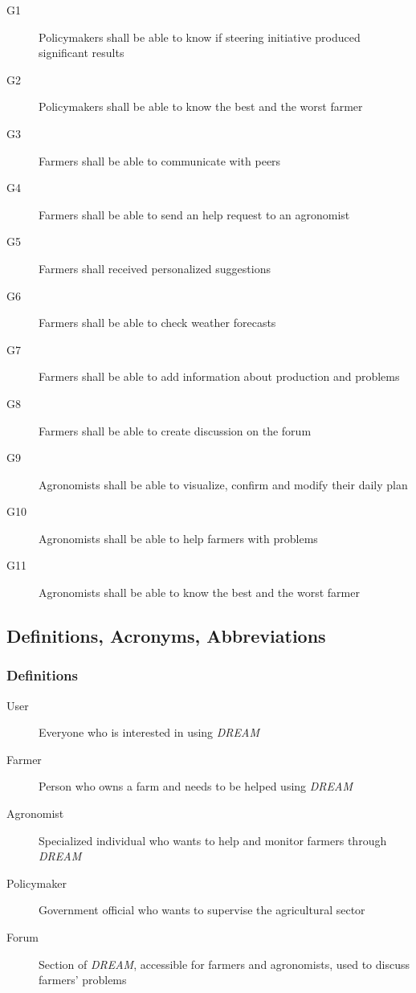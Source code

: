\begin{description}
    \item [G1] Policymakers shall be able to know if steering initiative produced significant results
    \item [G2] Policymakers shall be able to know the best and the worst farmer
    \item [G3] Farmers shall be able to communicate with peers
    \item [G4] Farmers shall be able to send an help request to an agronomist
    \item [G5] Farmers shall received personalized suggestions
    \item [G6] Farmers shall be able to check weather forecasts
    \item [G7] Farmers shall be able to add information about production and problems
    \item [G8] Farmers shall be able to create discussion on the forum
    \item [G9] Agronomists shall be able to visualize, confirm and modify their daily plan
    \item [G10] Agronomists shall be able to help farmers with problems
    \item [G11] Agronomists shall be able to know the best and the worst farmer
\end{description}

\subsection{Definitions, Acronyms, Abbreviations}

\subsubsection{Definitions}

\begin{description}
    \item [User] Everyone who is interested in using \emph{DREAM}
    \item [Farmer] Person who owns a farm and needs to be helped using \emph{DREAM}
    \item [Agronomist] Specialized individual who wants to help and monitor farmers through \emph{DREAM}
    \item [Policymaker] Government official who wants to supervise the agricultural sector
    \item [Forum] Section of \emph{DREAM}, accessible for farmers and agronomists, used to discuss farmers' problems
\end{description}

